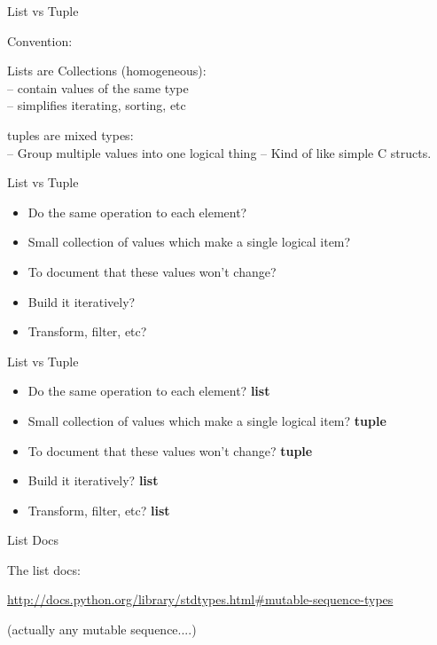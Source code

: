 \documentclass{beamer}
\begin{document}
\begin{frame}[fragile]{List vs Tuple}

\vfill
{\LARGE Convention:}

\vfill
{\Large Lists are Collections (homogeneous):\\[0.1in]
-- contain values of the same type \\ 
-- simplifies iterating, sorting, etc
}

\vfill
{\Large tuples are mixed types:\\[0.1in]
-- Group multiple values into one logical thing
-- Kind of like simple C structs.
}
\vfill

\end{frame} 

\begin{frame}[fragile]{List vs Tuple}

{\Large
\begin{itemize}
  \item Do the same operation to each element?
  \item Small collection of values which make a single logical item?
  \item To document that these values won't change?
  \item Build it iteratively?
  \item Transform, filter, etc?
\end{itemize}
}

\end{frame} 

\begin{frame}[fragile]{List vs Tuple}

{\Large
\begin{itemize}
  \item Do the same operation to each element? {\bf list}
  \item Small collection of values which make a single logical item? {\bf tuple}
  \item To document that these values won't change? {\bf tuple}
  \item Build it iteratively? {\bf list}
  \item Transform, filter, etc? {\bf list}
\end{itemize}
}

\end{frame} 

\begin{frame}[fragile]{List Docs}

\vfill
{\Large The list docs:}

\vfill
\url{http://docs.python.org/library/stdtypes.html#mutable-sequence-types}

\vfill
(actually any mutable sequence....)

\end{frame} 
\end{document}
